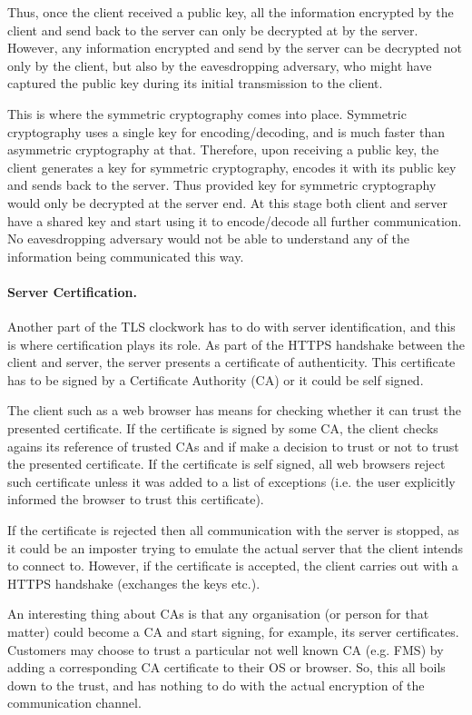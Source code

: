 \documentclass[a4paper,12pt,oneside,openright]{memoir}
\begin{document}
	Thus, once the client received a public key, all the information encrypted by the client and send back to the server can only be decrypted at by the server.
	However, any information encrypted and send by the server can be decrypted not only by the client, but also by the eavesdropping adversary, who might have captured the public key during its initial transmission to the client.

	This is where the symmetric cryptography comes into place.
	Symmetric cryptography uses a single key for encoding/decoding, and is much faster than asymmetric cryptography at that.
	Therefore, upon receiving a public key, the client generates a key for symmetric cryptography, encodes it with its public key and sends back to the server.
	Thus provided key for symmetric cryptography would only be decrypted at the server end.
	At this stage both client and server have a shared key and start using it to encode/decode all further communication.
	No eavesdropping adversary would not be able to understand any of the information being communicated this way.

	\paragraph{Server Certification.}
	Another part of the TLS clockwork has to do with server identification, and this is where certification plays its role.
	As part of the HTTPS handshake between the client and server, the server presents a certificate of authenticity.
	This certificate has to be signed by a Certificate Authority (CA) or it could be self signed.

	The client such as a web browser has means for checking whether it can trust the presented certificate.
	If the certificate is signed by some CA, the client checks agains its reference of trusted CAs and if make a decision to trust or not to trust the presented certificate.
	If the certificate is self signed, all web browsers reject such certificate unless it was added to a list of exceptions (i.e. the user explicitly informed the browser to trust this certificate).

	If the certificate is rejected then all communication with the server is stopped, as it could be an imposter trying to emulate the actual server that the client intends to connect to.
	However, if the certificate is accepted, the client carries out with a HTTPS handshake (exchanges the keys etc.).

	An interesting thing about CAs is that any organisation (or person for that matter) could become a CA and start signing, for example, its server certificates.
	Customers may choose to trust a particular not well known CA (e.g. FMS) by adding a corresponding CA certificate to their OS or browser.
	So, this all boils down to the trust, and has nothing to do with the actual encryption of the communication channel.
\end{document}
